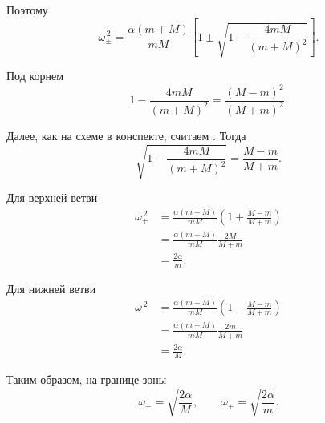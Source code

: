 \documentclass[../final.tex]{subfiles}
\begin{document}
Поэтому
%
\begin{equation*}
    \omega_\pm^{\,2}
    =
    \frac{\alpha(m+M)}{mM}
    \left[
        1
        \pm
        \sqrt{
            1-\frac{4mM}{(m+M)^2}
        }
    \right].
\end{equation*}
%

Под корнем
%
\begin{equation*}
    1-\frac{4mM}{(m+M)^2}
    =
    \frac{(M-m)^2}{(M+m)^2}.
\end{equation*}
%

Далее, как на схеме в конспекте,
считаем
.
Тогда
%
\begin{equation*}
    \sqrt{
        1-\frac{4mM}{(m+M)^2}
    }
    =
    \frac{M-m}{M+m}.
\end{equation*}
%

Для верхней ветви
%
\begin{align*}
    \omega_+^{\,2}
    &=
    \frac{\alpha(m+M)}{mM}
    \left(
        1+\frac{M-m}{M+m}
    \right)
    \\
    &=
    \frac{\alpha(m+M)}{mM}
    \frac{2M}{M+m}
    \\
    &=
    \frac{2\alpha}{m}.
\end{align*}
%

Для нижней ветви
%
\begin{align*}
    \omega_-^{\,2}
    &=
    \frac{\alpha(m+M)}{mM}
    \left(
        1-\frac{M-m}{M+m}
    \right)
    \\
    &=
    \frac{\alpha(m+M)}{mM}
    \frac{2m}{M+m}
    \\
    &=
    \frac{2\alpha}{M}.
\end{align*}
%

Таким образом, на границе зоны
%
\begin{equation*}
    \omega_-
    =
    \sqrt{\frac{2\alpha}{M}},
    \qquad
    \omega_+
    =
    \sqrt{\frac{2\alpha}{m}}.
\end{equation*}


\end{document}
